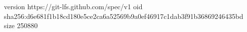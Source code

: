 version https://git-lfs.github.com/spec/v1
oid sha256:d6e681f1b18cd180e5ce2ca6a52569b9a0ef46917c1dab3f91b36869246435bd
size 250880
